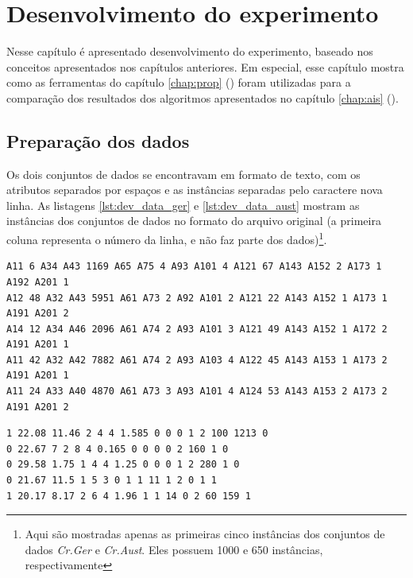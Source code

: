 \chapter{Desenvolvimento do experimento}

Nesse capítulo é apresentado desenvolvimento do experimento, baseado nos conceitos apresentados nos capítulos anteriores. Em especial, esse capítulo mostra como as ferramentas do capítulo \ref{chap:prop} () foram utilizadas para a comparação dos resultados dos algoritmos apresentados no capítulo \ref{chap:ais} ().

\section{Preparação dos dados}

Os dois conjuntos de dados se encontravam em formato de texto, com os atributos separados por espaços e as instâncias separadas pelo caractere nova linha. As listagens \ref{lst:dev_data_ger} e \ref{lst:dev_data_aust} mostram as instâncias dos conjuntos de dados no formato do arquivo original (a primeira coluna representa o número da linha, e não faz parte dos dados)\footnote{Aqui são mostradas apenas as primeiras cinco instâncias dos conjuntos de dados \emph{Cr.Ger} e \emph{Cr.Aust}. Eles possuem 1000 e 650 instâncias, respectivamente}.

\vspace{0.5cm}
\begin{lstlisting}[caption=Formato original dos dados (\emph{Cr.Ger}), label=lst:dev_data_ger]
A11 6 A34 A43 1169 A65 A75 4 A93 A101 4 A121 67 A143 A152 2 A173 1 A192 A201 1
A12 48 A32 A43 5951 A61 A73 2 A92 A101 2 A121 22 A143 A152 1 A173 1 A191 A201 2
A14 12 A34 A46 2096 A61 A74 2 A93 A101 3 A121 49 A143 A152 1 A172 2 A191 A201 1
A11 42 A32 A42 7882 A61 A74 2 A93 A103 4 A122 45 A143 A153 1 A173 2 A191 A201 1
A11 24 A33 A40 4870 A61 A73 3 A93 A101 4 A124 53 A143 A153 2 A173 2 A191 A201 2
\end{lstlisting}
\vspace{0.5cm}

\vspace{0.5cm}
\begin{lstlisting}[caption=Formato original dos dados (\emph{Cr.Aust}), label=lst:dev_data_aust]
1 22.08 11.46 2 4 4 1.585 0 0 0 1 2 100 1213 0
0 22.67 7 2 8 4 0.165 0 0 0 0 2 160 1 0
0 29.58 1.75 1 4 4 1.25 0 0 0 1 2 280 1 0
0 21.67 11.5 1 5 3 0 1 1 11 1 2 0 1 1
1 20.17 8.17 2 6 4 1.96 1 1 14 0 2 60 159 1
\end{lstlisting}
\vspace{0.5cm}

